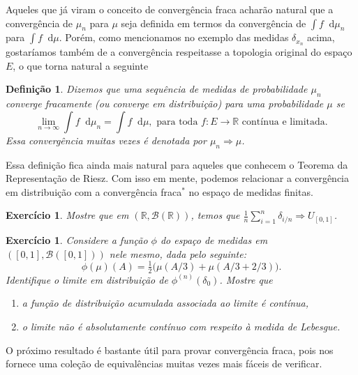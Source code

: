 \documentclass[reqno]{article}
\newcommand*\1{\mathds{1}}
\newtheorem{definition}[theorem]{Definição}
\newtheorem{exercise}[example]{Exercício}
\renewcommand*\d{\mathop{}\!\mathrm{d}}
\begin{document}
Aqueles que já viram o conceito de convergência fraca acharão natural que a convergência de $\mu_n$ para $\mu$ seja definida em termos da convergência de $\int f \d \mu_n$ para $\int f \d \mu$.
Porém, como mencionamos no exemplo das medidas $\delta_{x_n}$ acima, gostaríamos também de a convergência respeitasse a topologia original do espaço $E$, o que torna natural a seguinte

\begin{definition}
  Dizemos que uma sequência de medidas de probabilidade $\mu_n$ converge fracamente (ou converge em distribuição) para uma probabilidade $\mu$ se
  \begin{equation}
    \lim_{n \to \infty} \int f \d \mu_n = \int f \d \mu, \text{ para toda $f:E \to \mathbb{R}$ contínua e limitada.}
  \end{equation}
  Essa convergência muitas vezes é denotada por $\mu_n \Rightarrow \mu$.
\end{definition}

Essa definição fica ainda mais natural para aqueles que conhecem o Teorema da Representação de Riesz.
Com isso em mente, podemos relacionar a convergência em distribuição com a convergência fraca$^*$ no espaço de medidas finitas.

\begin{exercise}
  Mostre que em $(\mathbb{R}, \mathcal{B}(\mathbb{R}))$, temos que $\tfrac{1}{n} \sum_{i=1}^n \delta_{i/n} \Rightarrow U_{[0,1]}$.
\end{exercise}

\begin{exercise}
  Considere a função $\phi$ do espaço de medidas em $([0,1], \mathcal{B}([0,1]))$ nele mesmo, dada pelo seguinte:
  \begin{equation}
    \phi(\mu)(A) = \tfrac{1}{2} \big( \mu(A/3) + \mu(A/3 + 2/3) \big).
  \end{equation}
  Identifique o limite em distribuição de $\phi^{(n)}(\delta_0)$.
  Mostre que
  \begin{enumerate}[\quad a)]
  \item a função de distribuição acumulada associada ao limite é contínua,
  \item o limite não é absolutamente contínuo com respeito à medida de Lebesgue.
  \end{enumerate}
\end{exercise}

O próximo resultado é bastante útil para provar convergência fraca, pois nos fornece uma coleção de equivalências muitas vezes mais fáceis de verificar.
\end{document}
